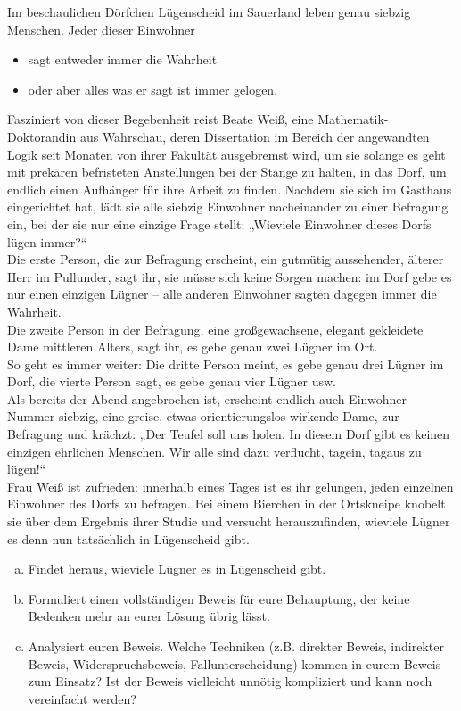 \begin{aufg}


Im beschaulichen Dörfchen Lügenscheid im Sauerland leben genau siebzig Menschen. Jeder dieser Einwohner 
  \begin{itemize}
   \item sagt entweder immer die Wahrheit
   \item oder aber alles was er sagt ist immer gelogen.
  \end{itemize}
   Fasziniert von dieser Begebenheit reist Beate Weiß, eine Mathematik-Doktorandin aus Wahrschau, deren Dissertation im Bereich der angewandten Logik seit Monaten von ihrer Fakultät ausgebremst wird, um sie solange es geht mit prekären befristeten Anstellungen bei der Stange zu halten, in das Dorf, um endlich einen Aufhänger für ihre Arbeit zu finden. Nachdem sie sich im Gasthaus eingerichtet hat, lädt sie alle siebzig Einwohner nacheinander zu einer Befragung ein, bei der sie nur eine einzige Frage stellt: „Wieviele Einwohner dieses Dorfs lügen immer?“ \\
   Die erste Person, die zur Befragung erscheint, ein gutmütig aussehender, älterer Herr im Pullunder, sagt ihr, sie müsse sich keine Sorgen machen: im Dorf gebe es nur einen einzigen Lügner -- alle anderen Einwohner sagten dagegen immer die Wahrheit. \\
   Die zweite Person in der Befragung, eine großgewachsene, elegant gekleidete Dame mittleren Alters, sagt ihr, es gebe genau zwei Lügner im Ort. \\
   So geht es immer weiter: Die dritte Person meint, es gebe genau drei Lügner im Dorf, die vierte Person sagt, es gebe genau vier Lügner usw. \\
   Als bereits der Abend angebrochen ist, erscheint endlich auch Einwohner Nummer siebzig, eine greise, etwas orientierungslos wirkende Dame, zur Befragung und krächzt: „Der Teufel soll uns holen. In diesem Dorf gibt es keinen einzigen ehrlichen Menschen. Wir alle sind dazu verflucht, tagein, tagaus zu lügen!“ \\
   Frau Weiß ist zufrieden: innerhalb eines Tages ist es ihr gelungen, jeden einzelnen Einwohner des Dorfs zu befragen. Bei einem Bierchen in der Ortskneipe knobelt sie über dem Ergebnis ihrer Studie und versucht herauszufinden, wieviele Lügner es denn nun tatsächlich in Lügenscheid gibt.
   \begin{enumerate}[a)]
    \item Findet heraus, wieviele Lügner es in Lügenscheid gibt.
    \item Formuliert einen vollständigen Beweis für eure Behauptung, der keine Bedenken mehr an eurer Lösung übrig lässt.
    \item Analysiert euren Beweis. Welche Techniken (z.B. direkter Beweis, indirekter Beweis, Widerspruchsbeweis, Fallunterscheidung) kommen in eurem Beweis zum Einsatz? Ist der Beweis vielleicht unnötig kompliziert und kann noch vereinfacht werden?
   \end{enumerate}
\end{aufg}





